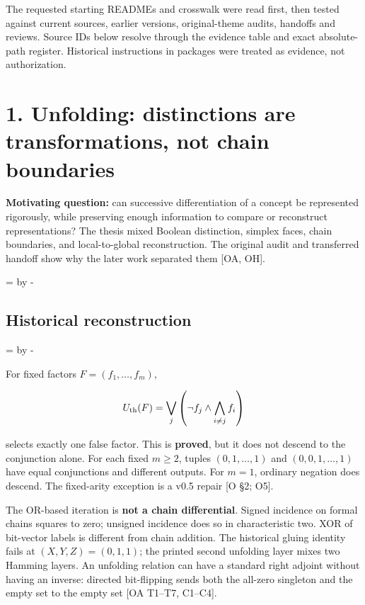 \documentclass[10pt,letterpaper]{article}
\newcommand{\NeedDisplaySpace}{\par\begingroup\dimen0=\pagegoal\advance\dimen0 by -\pagetotal\ifdim\dimen0<8\baselineskip\newpage\fi\endgroup}
\begin{document}
The requested starting READMEs and crosswalk were read first, then tested against current sources, earlier versions, original-theme audits, handoffs and reviews. Source IDs below resolve through the evidence table and exact absolute-path register. Historical instructions in packages were treated as evidence, not authorization.\par

\section*{1. Unfolding: distinctions are transformations, not chain boundaries}

\textbf{Motivating question:} can successive differentiation of a concept be represented rigorously, while preserving enough information to compare or reconstruct representations? The thesis mixed Boolean distinction, simplex faces, chain boundaries, and local-to-global reconstruction. The original audit and transferred handoff show why the later work separated them [OA, OH].\par

\NeedDisplaySpace
\subsection*{Historical reconstruction}

\NeedDisplaySpace
\begin{samepage}
For fixed factors \(F=(f_1,\ldots,f_m)\),\par
\[
U_{\rm th}(F)=\bigvee_j\left(\neg f_j\wedge\bigwedge_{i\ne j}f_i\right)
\]
\end{samepage}
selects exactly one false factor. This is \textbf{proved}, but it does not descend to the conjunction alone. For each fixed \(m\ge2\), tuples \((0,1,\ldots,1)\) and \((0,0,1,\ldots,1)\) have equal conjunctions and different outputs. For \(m=1\), ordinary negation does descend. The fixed-arity exception is a v0.5 repair [O \S{}2; O5].\par

The OR-based iteration is \textbf{not a chain differential}. Signed incidence on formal chains squares to zero; unsigned incidence does so in characteristic two. XOR of bit-vector labels is different from chain addition. The historical gluing identity fails at \((X,Y,Z)=(0,1,1)\); the printed second unfolding layer mixes two Hamming layers. An unfolding relation can have a standard right adjoint without having an inverse: directed bit-flipping sends both the all-zero singleton and the empty set to the empty set [OA T1--T7, C1--C4].\par
\end{document}
